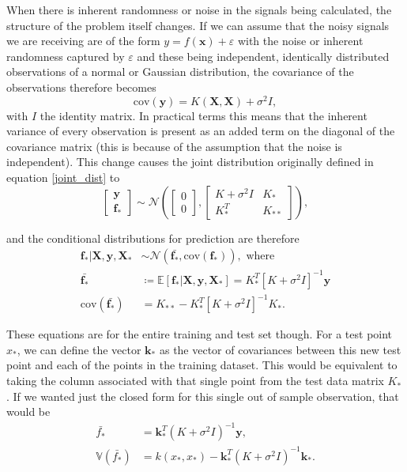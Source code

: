 When there is inherent randomness or noise in the signals being calculated, the structure of the problem itself changes. If we can assume that the noisy signals we are receiving are of the form $y = f(\boldsymbol{x}) + \varepsilon$ with the noise or inherent randomness captured by $\varepsilon$ and these being independent, identically distributed observations of a normal or Gaussian distribution, the covariance of the observations therefore becomes 
\[ \text{cov}(\boldsymbol{y}) = K(\boldsymbol{X}, \boldsymbol{X}) + \sigma^2 I, \]
with $I$ the identity matrix. In practical terms this means that the inherent variance of every observation is present as an added term on the diagonal of the covariance matrix (this is because of the assumption that the noise is independent). This change causes the joint distribution originally defined in equation \ref{joint_dist} to
\[ 
 \begin{bmatrix}
	\boldsymbol{y} \\
	\boldsymbol{f}_*
\end{bmatrix} \sim \mathcal{N}\left( \begin{bmatrix}
	0 \\
	0
\end{bmatrix} , \begin{bmatrix}
	K + \sigma^2 I & K_* \\
	K_*^T & K_{**}
\end{bmatrix} \right), 
 \]

and the conditional distributions for prediction are therefore 
\begin{align*}
	\boldsymbol{f}_* | \boldsymbol{X}, \boldsymbol{y}, \boldsymbol{X}_* &\sim \mathcal{N}(\bar{\boldsymbol{f}_*}, \text{cov}(\boldsymbol{f}_*)), \text{ where} \\
	\bar{\boldsymbol{f}_*} &\coloneqq \mathbb{E}[\boldsymbol{f}_* | \boldsymbol{X}, \boldsymbol{y}, \boldsymbol{X}_*] = K_*^T [K + \sigma^2 I]^{-1} \boldsymbol{y} \\
	\text{cov}(\bar{\boldsymbol{f}_*}) &= K_{**} -  K_*^T [K + \sigma^2 I]^{-1} K_*.
\end{align*}

These equations are for the entire training and test set though. For a test point $x_*$, we can define the vector $\boldsymbol{k}_*$ as the vector of covariances between this new test point and each of the points in the training dataset. This would be equivalent to taking the column associated with that single point from the test data matrix $K_*$. If we wanted just the closed form for this single out of sample observation, that would be 
\begin{align*}
\bar{f_*} &= \boldsymbol{k}_*^T(K + \sigma^2 I)^{-1} \boldsymbol{y}, \\
\mathbb{V}(\bar{f_*}) &= k(x_*, x_*) - \boldsymbol{k}_*^T (K + \sigma^2 I)^{-1} \boldsymbol{k}_*.
\end{align*}









 
 

